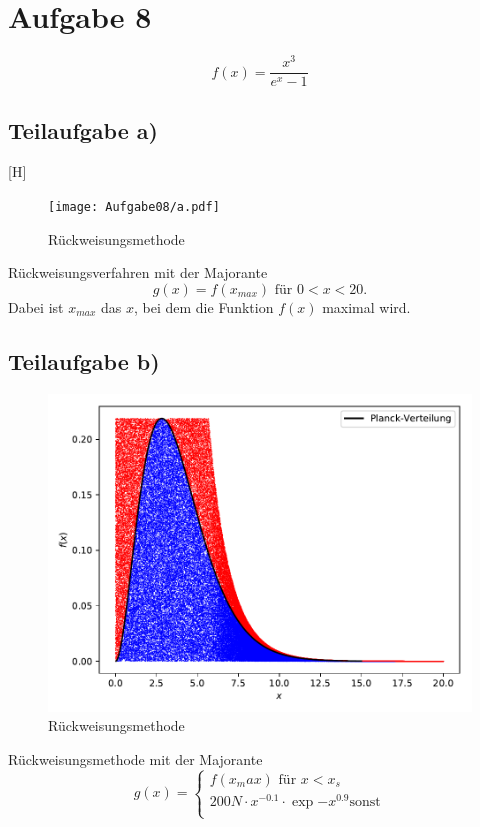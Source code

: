 \section{Aufgabe 8}
\begin{equation}
  f(x)=\frac{x^3}{e^x-1}
\end{equation}
\subsection{Teilaufgabe a)}[H] \label{sec:8a}
\begin{figure}
  \centering
  \texttt{[image: Aufgabe08/a.pdf]}
  \caption{Rückweisungsmethode}
  \label{fig:rwm1}
\end{figure}
Rückweisungsverfahren mit der Majorante
\begin{equation}
  g(x)=f(x_{max}) \text{ für } 0 < x < 20 \text{.}
\end{equation}
Dabei ist $x_{max}$ das $x$, bei dem die Funktion $f(x)$ maximal wird.
\subsection{Teilaufgabe b)} \label{sec:8b}
\begin{figure}[H]
  \centering
  \includegraphics{Aufgabe08/b.pdf}
  \caption{Rückweisungsmethode}
  \label{fig:rwm2}
\end{figure}

Rückweisungsmethode mit der Majorante
\begin{equation}
  g(x)=
  \begin{cases}
    f(x_max) \text{ für }  x < x_s \\
    200N \cdot x^{-0.1} \cdot \exp{-x^{0.9}} \text{sonst}\\
\end{cases}
\end{equation}

